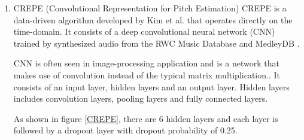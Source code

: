 \begin{enumerate}
	\begin{figure}
		\centering
		\begin{subfigure}{.3\textwidth}
		  \centering
		  \texttt{[image: signalwaveform.png]}
		  \caption{Signal waveform}
		  \label{signal}
		\end{subfigure}%
		\begin{subfigure}{.3\textwidth}
			\centering
			\texttt{[image: acf.png]}
			\caption{$r_t(\tau)$ calculated from figure \ref{signal}  using normal ACF}
			\label{acf}
		  \end{subfigure}%
		\begin{subfigure}{.3\textwidth}
		  \centering
		  \texttt{[image: taperedacf.png]}
		  \caption{$r_t(\tau)$ calculated with the equation \ref{signal}}
		  \label{taped}
		\end{subfigure}%
		\label{YIN}
	\end{figure}
	
	We then select the highest peak by exhaustive search within an user-defined range of lags, the corresponding time lag will be
	the inverse of our estimated $f0$

	To improve the error rates and target periodicity, de Cheveigné \& Kawahara introduced a cumulative mean normalized difference function (CMNDF)
	to replace ACF. 
	\[CMNDF(\tau) =  
	\begin{cases}
		1,              & \text{if } \tau \eq 0\\ 
    	\frac{DF(\tau)}{(1/\tau)\sum_{j=1}{\tau}DF(j)}, & \text{otherwise.} \\
	\end{cases}
	\]
	We then find $\tau$ that minimises $CMNDF(\tau)$ and the corresponding $f0$.

	\item CREPE (Convolutional Representation for Pitch Estimation)
	CREPE is a data-driven algorithm developed by Kim et al. that operates directly on the time-domain.
	It consists of a deep convolutional neural network (CNN) trained by synthesized audio from the RWC Music Database \cite{rwcdb}
	and MedleyDB \cite{medleydb}. 

	CNN is often seen in image-processing application and is a network that makes use of convolution instead of the typical matrix multiplication..
	It consists of an input layer, hidden layers and an output layer. Hidden layers includes convolution layers, pooling layers and fully connected layers.
	
	As shown in figure \ref{CREPE}, there are 6 hidden layers and each layer is followed by a dropout layer with dropout probability of 0.25. 


\end{enumerate}
